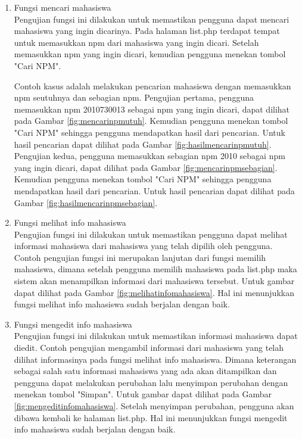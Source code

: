 \begin{enumerate}[(1)]
\item Fungsi mencari mahasiswa\\
    Pengujian fungsi ini dilakukan untuk memastikan pengguna dapat mencari mahasiswa yang ingin dicarinya. Pada halaman list.php terdapat tempat untuk memasukkan npm dari mahasiswa yang ingin dicari. Setelah memasukkan npm yang ingin dicari, kemudian pengguna menekan tombol "Cari NPM".
    
    Contoh kasus adalah melakukan pencarian mahasiswa dengan memasukkan npm seutuhnya dan sebagian npm. Pengujian pertama, pengguna memasukkan npm 2010730013 sebagai npm yang ingin dicari, dapat dilihat pada Gambar \ref{fig:mencarinpmutuh}. Kemudian pengguna menekan tombol "Cari NPM" sehingga pengguna mendapatkan hasil dari pencarian. Untuk hasil pencarian dapat dilihat pada Gambar \ref{fig:hasilmencarinpmutuh}. Pengujian kedua, pengguna memasukkan sebagian npm 2010 sebagai npm yang ingin dicari, dapat dilihat pada Gambar \ref{fig:mencarinpmsebagian}. Kemudian pengguna menekan tombol "Cari NPM" sehingga pengguna mendapatkan hasil dari pencarian. Untuk hasil pencarian dapat dilihat pada Gambar \ref{fig:hasilmencarinpmsebagian}.
	
\item Fungsi melihat info mahasiswa\\
	Pengujian fungsi ini dilakukan untuk memastikan pengguna dapat melihat informasi mahasiswa dari mahasiswa yang telah dipilih oleh pengguna. Contoh pengujian fungsi ini merupakan lanjutan dari fungsi memilih mahasiswa, dimana setelah pengguna memilih mahasiswa pada list.php maka sistem akan menampilkan informasi dari mahasiswa tersebut. Untuk gambar dapat dilihat pada Gambar \ref{fig:melihatinfomahasiswa}. Hal ini menunjukkan fungsi melihat info mahasiswa sudah berjalan dengan baik.
	
\item Fungsi mengedit info mahasiswa\\
	Pengujian fungsi ini dilakukan untuk memastikan informasi mahasiswa dapat diedit. Contoh pengujian mengambil informasi dari mahasiswa yang telah dilihat informasinya pada fungsi melihat info mahasiswa. Dimana keterangan sebagai salah satu informasi mahasiswa yang ada akan ditampilkan dan pengguna dapat melakukan perubahan lalu menyimpan perubahan dengan menekan tombol "Simpan". Untuk gambar dapat dilihat pada Gambar \ref{fig:mengeditinfomahasiswa}. Setelah menyimpan perubahan, pengguna akan dibawa kembali ke halaman list.php. Hal ini menunjukkan fungsi mengedit info mahasiswa sudah berjalan dengan baik.


\end{enumerate}
